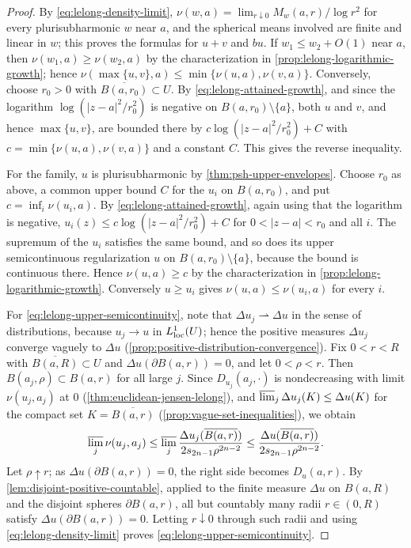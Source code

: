 \begin{proof}
By \eqref{eq:lelong-density-limit}, $\nu(w,a)=\lim_{r\downarrow0}M_w(a,r)/\log r^2$ for every plurisubharmonic $w$ near $a$, and the spherical means involved are finite and linear in $w$; this proves the formulas for $u+v$ and $bu$. If $w_1\leq w_2+O(1)$ near $a$, then $\nu(w_1,a)\geq\nu(w_2,a)$ by the characterization in \cref{prop:lelong-logarithmic-growth}; hence $\nu(\max\{u,v\},a)\leq\min\{\nu(u,a),\nu(v,a)\}$. Conversely, choose $r_0>0$ with $\overline{B(a,r_0)}\subset U$. By \eqref{eq:lelong-attained-growth}, and since the logarithm $\log(|z-a|^2/r_0^2)$ is negative on $B(a,r_0)\setminus\{a\}$, both $u$ and $v$, and hence $\max\{u,v\}$, are bounded there by $c\log(|z-a|^2/r_0^2)+C$ with $c=\min\{\nu(u,a),\nu(v,a)\}$ and a constant $C$. This gives the reverse inequality.

For the family, $u$ is plurisubharmonic by \cref{thm:psh-upper-envelopes}. Choose $r_0$ as above, a common upper bound $C$ for the $u_i$ on $B(a,r_0)$, and put $c=\inf_i\nu(u_i,a)$. By \eqref{eq:lelong-attained-growth}, again using that the logarithm is negative, $u_i(z)\leq c\log(|z-a|^2/r_0^2)+C$ for $0<|z-a|<r_0$ and all $i$. The supremum of the $u_i$ satisfies the same bound, and so does its upper semicontinuous regularization $u$ on $B(a,r_0)\setminus\{a\}$, because the bound is continuous there. Hence $\nu(u,a)\geq c$ by the characterization in \cref{prop:lelong-logarithmic-growth}. Conversely $u\geq u_i$ gives $\nu(u,a)\leq\nu(u_i,a)$ for every $i$.

For \eqref{eq:lelong-upper-semicontinuity}, note that $\Delta u_j\rightharpoonup\Delta u$ in the sense of distributions, because $u_j\to u$ in $L^1_{\mathrm{loc}}(U)$; hence the positive measures $\Delta u_j$ converge vaguely to $\Delta u$ (\cref{prop:positive-distribution-convergence}). Fix $0<r<R$ with $\overline{B(a,R)}\subset U$ and $\Delta u(\partial B(a,r))=0$, and let $0<\rho<r$. Then $B(a_j,\rho)\subset B(a,r)$ for all large $j$. Since $D_{u_j}(a_j,\cdot)$ is nondecreasing with limit $\nu(u_j,a_j)$ at $0$ (\cref{thm:euclidean-jensen-lelong}), and $\varlimsup_j\Delta u_j(K)\leq\Delta u(K)$ for the compact set $K=\overline{B(a,r)}$ (\cref{prop:vague-set-inequalities}), we obtain
\[
 \varlimsup_j\nu(u_j,a_j)
 \leq\varlimsup_j\frac{\Delta u_j(\overline{B(a,r)})}{2s_{2n-1}\rho^{2n-2}}
 \leq\frac{\Delta u(\overline{B(a,r)})}{2s_{2n-1}\rho^{2n-2}}.
\]
Let $\rho\uparrow r$; as $\Delta u(\partial B(a,r))=0$, the right side becomes $D_u(a,r)$. By \cref{lem:disjoint-positive-countable}, applied to the finite measure $\Delta u$ on $B(a,R)$ and the disjoint spheres $\partial B(a,r)$, all but countably many radii $r\in(0,R)$ satisfy $\Delta u(\partial B(a,r))=0$. Letting $r\downarrow0$ through such radii and using \eqref{eq:lelong-density-limit} proves \eqref{eq:lelong-upper-semicontinuity}.


\end{proof}
